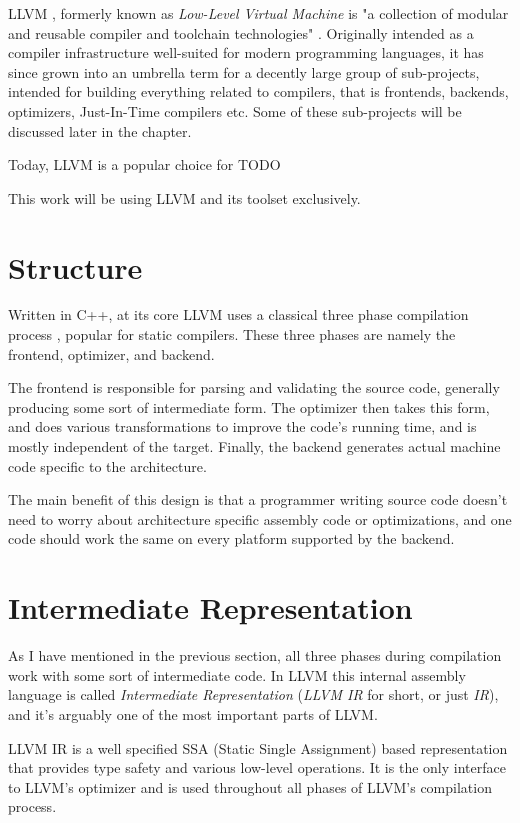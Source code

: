 LLVM \cite{Lattner:MSThesis02}, formerly known as \emph{Low-Level Virtual Machine} is "a collection of modular and reusable compiler and toolchain technologies" \cite{llvm_web}. Originally intended as a compiler infrastructure well-suited for modern programming languages, it has since grown into an umbrella term for a decently large group of sub-projects, intended for building everything related to compilers, that is frontends, backends, optimizers, Just-In-Time compilers etc. Some of these sub-projects will be discussed later in the chapter.

Today, LLVM is a popular choice for TODO

This work will be using LLVM and its toolset exclusively.

\section{Structure}
Written in C++, at its core LLVM uses a classical three phase compilation process \cite{Lattner:LLVM_Design}, popular for static compilers. These three phases are namely the frontend, optimizer, and backend.

The frontend is responsible for parsing and validating the source code, generally producing some sort of intermediate form. The optimizer then takes this form, and does various transformations to improve the code's running time, and is mostly independent of the target. Finally, the backend generates actual machine code specific to the architecture.

The main benefit of this design is that a programmer writing source code doesn't need to worry about architecture specific assembly code or optimizations, and one code should work the same on every platform supported by the backend.

\section{Intermediate Representation}
As I have mentioned in the previous section, all three phases during compilation work with some sort of intermediate code. In LLVM this internal assembly language is called \emph{Intermediate Representation} \cite{llvm_ir} (\emph{LLVM IR} for short, or just \emph{IR}), and it's arguably one of the most important parts of LLVM.

LLVM IR is a well specified SSA (Static Single Assignment) based representation that provides type safety and various low-level operations. It is the only interface to LLVM's optimizer and is used throughout all phases of LLVM's compilation process.

